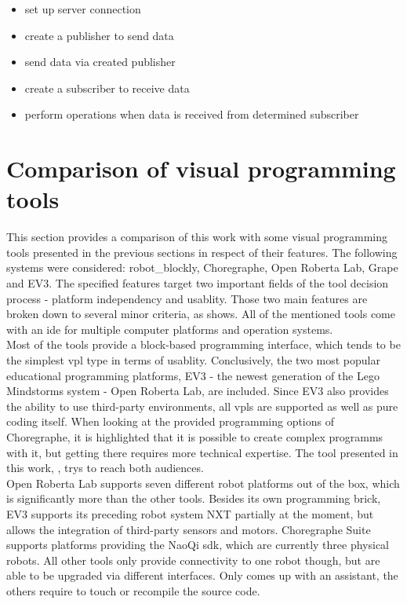 \begin{itemize}
	\item set up server connection
	\item create a publisher to send data
	\item send data via created publisher
	\item create a subscriber to receive data
	\item perform operations when data is received from determined subscriber
\end{itemize}

\section{Comparison of visual programming tools}
This section provides a comparison of this work with some visual programming tools presented in the previous sections in respect of their features. The following systems were considered: robot\_blockly\cite{erleROS}, Choregraphe\cite{Choregraphe5326209}, Open Roberta Lab\cite{Ketterl_Jost_Leimbach_Budde_2015}, Grape\cite{Grape} and EV3\cite{LegoEV3}. The specified features target two important fields of the tool decision process - platform independency and usablity. Those two main features are broken down to several minor criteria, as  shows. All of the mentioned tools come with an \gls{ide} for multiple computer platforms and operation systems. \\

Most of the tools provide a block-based programming interface, which tends to be the simplest \gls{vpl} type in terms of usablity. Conclusively, the two most popular educational programming platforms, EV3 - the newest generation of the Lego Mindstorms system - Open Roberta Lab, are included. Since EV3 also provides the ability to use third-party environments, all \glspl{vpl} are supported as well as pure coding itself. When looking at the provided programming options of Choregraphe, it is highlighted that it is possible to create complex programms with it, but getting there requires more technical expertise. The tool presented in this work, \toolname{}, trys to reach both audiences. \\

Open Roberta Lab supports seven different robot platforms out of the box, which is significantly more than the other tools. Besides its own programming brick, EV3 supports its
preceding robot system NXT partially at the moment, but allows the integration of third-party sensors and motors. Choregraphe Suite supports platforms providing the NaoQi \gls{sdk}, which are currently three physical robots. All other tools only provide connectivity to one robot though, but are able to be upgraded via different interfaces. Only \toolname{} comes up with an assistant, the others require to touch or recompile the source code. \\

